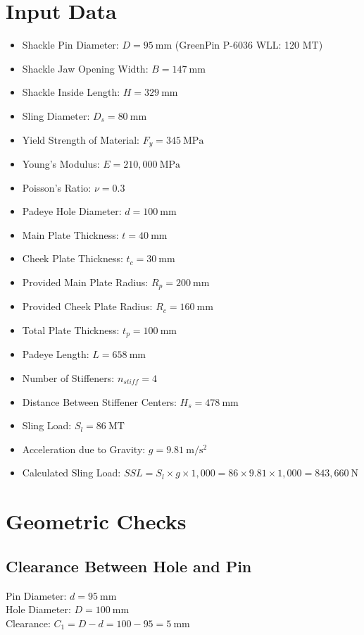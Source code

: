 \documentclass[12pt]{article}
\begin{document}
\section{Input Data}
\begin{itemize}
  \item Shackle Pin Diameter: $D = 95\ \mathrm{mm}$ (GreenPin P-6036 WLL: 120 MT)
  \item Shackle Jaw Opening Width: $B = 147\ \mathrm{mm}$
  \item Shackle Inside Length: $H = 329\ \mathrm{mm}$
  \item Sling Diameter: $D_s = 80\ \mathrm{mm}$
  \item Yield Strength of Material: $F_y = 345\ \mathrm{MPa}$
  \item Young's Modulus: $E = 210,000\ \mathrm{MPa}$
  \item Poisson's Ratio: $\nu = 0.3$
  \item Padeye Hole Diameter: $d = 100\ \mathrm{mm}$
  \item Main Plate Thickness: $t = 40\ \mathrm{mm}$
  \item Cheek Plate Thickness: $t_c = 30\ \mathrm{mm}$
  \item Provided Main Plate Radius: $R_p = 200\ \mathrm{mm}$
  \item Provided Cheek Plate Radius: $R_c = 160\ \mathrm{mm}$
  \item Total Plate Thickness: $t_p = 100\ \mathrm{mm}$
  \item Padeye Length: $L = 658\ \mathrm{mm}$
  \item Number of Stiffeners: $n_{stiff} = 4$
  \item Distance Between Stiffener Centers: $H_s = 478\ \mathrm{mm}$
  \item Sling Load: $S_l = 86\ \mathrm{MT}$
  \item Acceleration due to Gravity: $g = 9.81\ \mathrm{m/s^2}$
  \item Calculated Sling Load: $SSL = S_l \times g \times 1,000 = 86 \times 9.81 \times 1,000 = 843,660\ \mathrm{N}$
\end{itemize}

\section{Geometric Checks}
\subsection{Clearance Between Hole and Pin}
Pin Diameter: $d = 95\ \mathrm{mm}$\\
Hole Diameter: $D = 100\ \mathrm{mm}$\\
Clearance: $C_1 = D - d = 100 - 95 = 5\ \mathrm{mm}$
\end{document}
